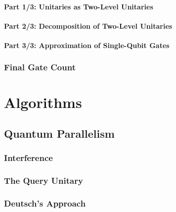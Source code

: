             \subsubsection{Part 1/3: Unitaries as Two-Level Unitaries} %

            \subsubsection{Part 2/3: Decomposition of Two-Level Unitaries} %

            \subsubsection{Part 3/3: Approximation of Single-Qubit Gates} %

        \subsection{Final Gate Count} %

\chapter{Algorithms} %

    \section{Quantum Parallelism} %

        \subsection{Interference} %

        \subsection{The Query Unitary} %

        \subsection{Deutsch's Approach} %

